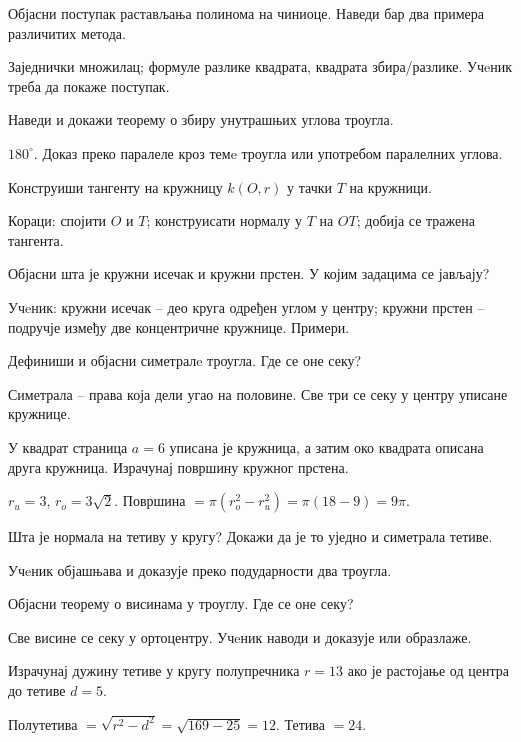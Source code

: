 \documentclass[10pt,a5paper,twoside,addpoints,answers]{exam}
\begin{document}
\begin{questions}
\question[--] Објасни поступак растављања полинома на чиниоце. Наведи бар два примера различитих метода.
\begin{solution}
Заједнички множилац; формуле разлике квадрата, квадрата збира/разлике. Учeник треба да покаже поступак.
\end{solution}

\question[--] Наведи и докажи теорему о збиру унутрашњих углова троугла.
\begin{solution}
$180^\circ$. Доказ преко паралеле кроз темe троугла или употребом паралелних углова.
\end{solution}

\question[--] Конструиши тангенту на кружницу $k(O,r)$ у тачки $T$ на кружници.
\begin{solution}
Кораци: спојити $O$ и $T$; конструисати нормалу у $T$ на $OT$; добија се тражена тангента.
\end{solution}

\question[--] Објасни шта је кружни исечак и кружни прстен. У којим задацима се јављају?
\begin{solution}
Учeник: кружни исечак – део круга одређен углом у центру; кружни прстен – подручје између две концентричне кружнице. Примери.
\end{solution}

\question[--] Дефиниши и објасни симетралe троугла. Где се оне секу?
\begin{solution}
Симетрала – права која дели угао на половине. Све три се секу у центру уписане кружнице.
\end{solution}

\question[--] У квадрат страница $a=6$ уписана је кружница, а затим око квадрата описана друга кружница. Израчунај површину кружног прстена.
\begin{solution}
$r_u=3$, $r_o=3\sqrt2$. Површина $=\pi(r_o^2-r_u^2)=\pi(18-9)=9\pi$.
\end{solution}

\question[--] Шта је нормала на тетиву у кругу? Докажи да је то уједно и симетрала тетиве.
\begin{solution}
Учeник објашњава и доказује преко подударности два троугла.
\end{solution}

\question[--] Објасни теорему о висинама у троуглу. Где се оне секу?
\begin{solution}
Све висине се секу у ортоцентру. Учeник наводи и доказује или образлаже.
\end{solution}

\question[--] Израчунај дужину тетиве у кругу полупречника $r=13$ ако је растојање од центра до тетиве $d=5$.
\begin{solution}
Полутетива $=\sqrt{r^2-d^2}=\sqrt{169-25}=12$. Тетива $=24$.
\end{solution}

\end{questions}
\end{document}
